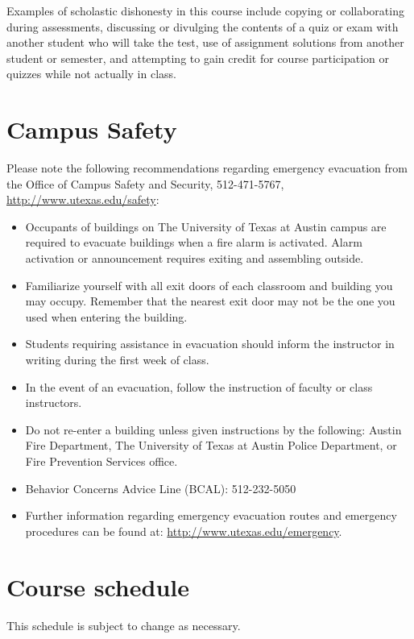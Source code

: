\documentclass[12pt]{article}
\begin{document}
Examples of scholastic dishonesty in this course include copying or collaborating during assessments, discussing or divulging the contents of a quiz or exam with another student who will take the test, use of assignment solutions from another student or semester, and attempting to gain credit for course participation or quizzes while not actually in class.


\section*{Campus Safety}
Please note the following recommendations regarding emergency evacuation from the Office of Campus Safety and Security, 512-471-5767, \url{http://www.utexas.edu/safety}:
\begin{itemize}
\item   Occupants of buildings on The University of Texas at Austin campus are required to evacuate buildings when a fire alarm is activated.  Alarm activation or announcement requires exiting and assembling outside.
\item   Familiarize yourself with all exit doors of each classroom and building you may occupy.  Remember that the nearest exit door may not be the one you used when entering the building.
\item   Students requiring assistance in evacuation should inform the instructor in writing during the first week of class.
\item   In the event of an evacuation, follow the instruction of faculty or class instructors.
\item   Do not re-enter a building unless given instructions by the following: Austin Fire Department, The University of Texas at Austin Police Department, or Fire Prevention Services office.
\item   Behavior Concerns Advice Line (BCAL):  512-232-5050
\item   Further information regarding emergency evacuation routes and emergency procedures can be found at: \url{http://www.utexas.edu/emergency}.
\end{itemize}


\section*{Course schedule}
This schedule is subject to change as necessary.
\end{document}

